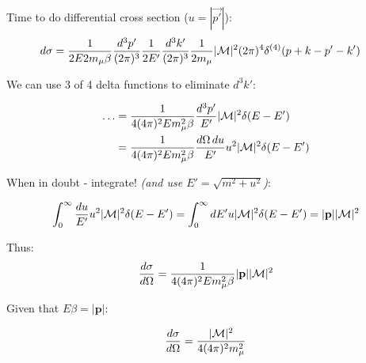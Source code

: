 \documentclass[11pt]{article}
\begin{document}
Time to do differential cross section ($u = |\vec{p'}|$):
\begin{equation}
  \begin{split}
  d\sigma & = \frac{1}{2 E 2 m_\mu \beta}
    \frac{d^3 p'}{(2 \pi)^3} \frac{1} {2 E'}
    \frac{d^3 k'} {(2 \pi)^3} \frac{1} {2 m_\mu}
    |{\cal{M}}|^2 (2 \pi)^4 \delta^{(4)}(p + k - p' - k')
  \end{split}
\end{equation}

We can use 3 of 4 delta functions to eliminate $d^3k'$:  
  
\begin{equation}
  \begin{split}
  \ldots & = \frac{1}{4 (4 \pi)^2 E m_\mu^2 \beta} \frac{d^3p'} {E'}
    |{\cal{M}}|^2 \delta(E - E') \\
  & = \frac{1}{4 (4 \pi)^2 E m_\mu^2 \beta} \frac{d\Omega \, du}{E'}
    u^2 |{\cal{M}}|^2 \delta(E - E')
  \end{split}
\end{equation}

When in doubt - integrate! \textit{(and use $E' = \sqrt{m^2 + u^2}$)}:

\begin{equation}
  \int_0^\infty \frac{du} {E'} u^2 |{\cal{M}}|^2 \delta(E - E')
  = \int_0^\infty dE' u |{\cal{M}}|^2 \delta(E - E')
  = |\textbf{p}| |{\cal{M}}|^2
\end{equation}

Thus:
\begin{equation}
  \frac{d\sigma}{d\Omega} = \frac{1}{4 (4 \pi)^2 E m_\mu^2 \beta}
    |\textbf{p}| |{\cal{M}}|^2
\end{equation}

Given that $E\beta = |\textbf{p}|$:

\begin{equation}
  \frac{d\sigma}{d\Omega} = \frac{|{\cal{M}}|^2}{4 (4 \pi)^2 m_\mu^2}
\end{equation}
\end{document}
